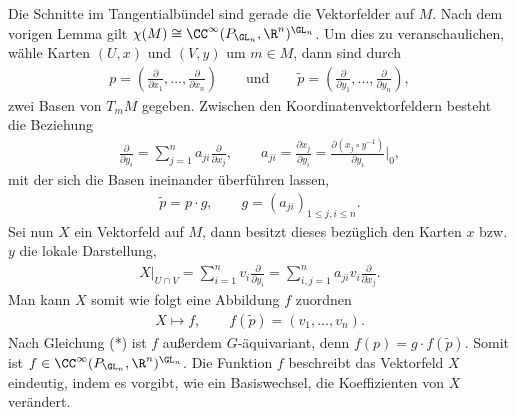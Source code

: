 \documentclass[%
	paper=a5,%
	fleqn,%
	DIV=18,%
	BCOR=0mm,
	fontsize=11pt,
	titlepage=false,%
	bibliography=totoc,
	DIV=18,%
	twoside=true,
	pdftitle=Riemannsche Geometrie,
	pdfauthor=Uwe Semmelmann,
	numbers=noendperiod]%
	{scrbook}
\begin{document}
\begin{ex}
Die Schnitte im Tangentialbündel sind gerade die Vektorfelder auf
$M$. Nach dem vorigen Lemma gilt $\chi(M)\cong
\CC^\infty(P_{\GL_n},\R^n)^{\GL_n}$. Um dies zu veranschaulichen, wähle Karten
$(U,x)$ und $(V,y)$ um $m \in M$, dann sind durch
\begin{align*}
p = \left(\frac{\partial}{\partial x_1},\ldots,\frac{\partial}{\partial x_n}
\right)\qquad\text{und}\qquad
\tilde{p} = 
\left(\frac{\partial}{\partial y_1},\ldots,\frac{\partial}{\partial y_n}
\right),
\end{align*}
zwei Basen von $T_mM$ gegeben. Zwischen den Koordinatenvektorfeldern besteht
die Beziehung
\begin{align*}
\frac{\partial}{\partial y_i} = \sum_{j=1}^n a_{ji}\frac{\partial }{\partial
x_j},\qquad
a_{ji} = \frac{\partial x_j}{\partial y_i}
= \frac{\partial (x_j\circ y^{-1})}{\partial y_i}\bigg|_0,
\end{align*}
mit der sich die Basen ineinander überführen lassen,
\begin{align*}
\tilde{p} = p\cdot g,\qquad g = (a_{ji})_{1\le j,i\le n}.
\end{align*}
Sei nun $X$ ein Vektorfeld auf $M$, dann besitzt dieses bezüglich den Karten $x$
bzw. $y$ die lokale Darstellung,
\begin{align*}
X\big|_{U\cap V} = \sum_{i=1}^n v_i \frac{\partial}{\partial y_i}
= \sum_{i,j=1}^n a_{ji}v_i \frac{\partial}{\partial x_j}.\tag{*}
\end{align*}
Man kann $X$ somit wie folgt eine Abbildung $f$ zuordnen
\begin{align*}
X\mapsto f,\qquad f(\tilde{p}) = (v_1,\ldots,v_n).
\end{align*}
Nach Gleichung (*) ist $f$ außerdem $G$-äquivariant, denn $f(p) = g\cdot
f(\tilde{p})$. Somit ist
$f\in\CC^\infty(P_{\GL_n}, \R^n)^{\GL_n}$. Die Funktion
$f$ beschreibt das Vektorfeld $X$ eindeutig, indem es vorgibt, wie ein
Basiswechsel, die Koeffizienten von $X$ verändert.\bsp
\end{ex}
\end{document}
